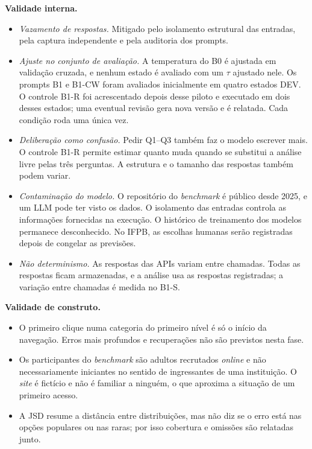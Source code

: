 \documentclass[12pt]{article}
\begin{document}
\textbf{Validade interna.}
\begin{itemize}[leftmargin=*,itemsep=0pt]
\item \textit{Vazamento de respostas.} Mitigado pelo isolamento estrutural das entradas, pela captura independente e pela auditoria dos prompts.
\item \textit{Ajuste no conjunto de avaliação.} A temperatura do B0 é ajustada em validação cruzada, e nenhum estado é avaliado com um $\tau$ ajustado nele. Os prompts B1 e B1-CW foram avaliados inicialmente em quatro estados DEV. O controle B1-R foi acrescentado depois desse piloto e executado em dois desses estados; uma eventual revisão gera nova versão e é relatada. Cada condição roda uma única vez.
\item \textit{Deliberação como confusão.} Pedir Q1--Q3 também faz o modelo escrever mais. O controle B1-R permite estimar quanto muda quando se substitui a análise livre pelas três perguntas. A estrutura e o tamanho das respostas também podem variar.
\item \textit{Contaminação do modelo.} O repositório do \textit{benchmark} é público desde 2025, e um LLM pode ter visto os dados. O isolamento das entradas controla as informações fornecidas na execução. O histórico de treinamento dos modelos permanece desconhecido. No IFPB, as escolhas humanas serão registradas depois de congelar as previsões.
\item \textit{Não determinismo.} As respostas das APIs variam entre chamadas. Todas as respostas ficam armazenadas, e a análise usa as respostas registradas; a variação entre chamadas é medida no B1-S.
\end{itemize}

\textbf{Validade de construto.}
\begin{itemize}[leftmargin=*,itemsep=0pt]
\item O primeiro clique numa categoria do primeiro nível é só o início da navegação. Erros mais profundos e recuperações não são previstos nesta fase.
\item Os participantes do \textit{benchmark} são adultos recrutados \textit{online} e não necessariamente iniciantes no sentido de ingressantes de uma instituição. O \textit{site} é fictício e não é familiar a ninguém, o que aproxima a situação de um primeiro acesso.
\item A JSD resume a distância entre distribuições, mas não diz se o erro está nas opções populares ou nas raras; por isso cobertura e omissões são relatadas junto.
\end{itemize}
\end{document}
